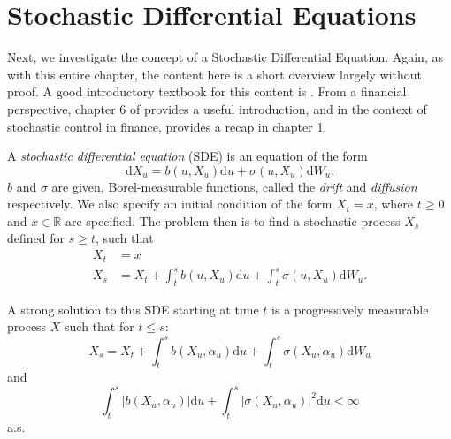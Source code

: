 \section{Stochastic Differential Equations}\label{sec:1.6}

Next, we investigate the concept of a Stochastic Differential Equation. Again, as 
with this entire chapter, the content here is a short overview largely without proof.
A good introductory textbook for this content is \cite{ASDEs}. From a financial 
perspective, chapter 6 of \cite{SCfFII} provides a useful introduction, and in the 
context of stochastic control in finance, \cite{Pham} provides a recap in chapter 1.

\begin{definition}
    A \emph{stochastic differential equation} (SDE) is an equation of the form
    \begin{equation}\label{eq:1.28}
        \mathrm dX_u=b(u,X_u)\mathrm du+\sigma(u,X_u)\mathrm dW_u.
    \end{equation}
    $b$ and $\sigma$ are given, Borel-measurable functions, called the
    \emph{drift} and \emph{diffusion} respectively. We also specify an initial condition
    of the form $X_t=x$, where $t\geq0$ and $x\in\mathbb{R}$ are specified. The problem
    then is to find a stochastic process $X_s$ defined for $s\geq t$, such that
    \begin{align*}
        X_t&=x\\
        X_s&=X_t+\int_t^sb(u,X_u)\mathrm du+\int_t^s\sigma(u,X_u)\mathrm dW_u.
    \end{align*}
\end{definition}

\begin{definition}
    A strong solution to this SDE starting at time $t$ is a progressively measurable 
    process $X$ such that for $t\leq s$:
    $$X_s=X_t+\int_{t}^{s}b(X_u,\alpha_u)\mathrm du+\int_t^s\sigma(X_u,\alpha_u)\mathrm dW_u$$
    and
    $$\int_t^s|b(X_u,\alpha_u)|\mathrm du+\int_t^s|\sigma(X_u,\alpha_u)|^2\mathrm du<\infty$$
    a.s.
\end{definition}

